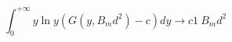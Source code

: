 \begin{equation} \int_{0}^{+\infty}y \ln
y \left(G(y,B_{m}d^{2})-c \right) dy \rightarrow c1\: B_{m}d^{2}
\end{equation}

